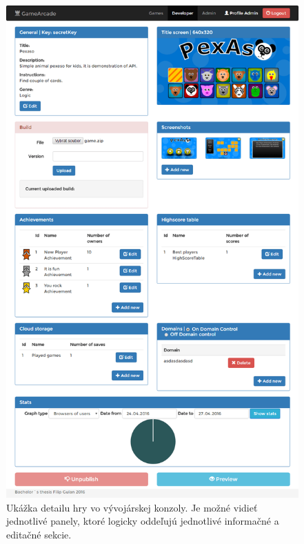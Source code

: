 \begin{figure}[h]
  \centering
  \includegraphics[scale=0.35]{fig/ukazka-detail-vyvojar.png}
  \caption{Ukážka detailu hry vo vývojárskej konzoly. Je možné vidieť jednotlivé panely, ktoré logicky oddeľujú jednotlivé informačné a editačné sekcie.}
  \label{fig:ukazka-detialvyvojar}
\end{figure}


